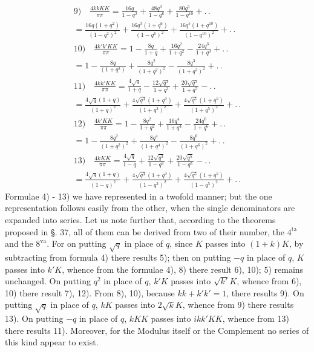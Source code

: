 \documentclass{article}
\begin{document}
\[
\begin{gathered}
\text{9)}\quad\frac{4kkKK}{\pi\pi}=\frac{16q}{1-q^{2}}+\frac{48q^{3}}{1-q^{6}}+\frac{80q^{5}}{1-q^{10}}+.\,.\\[2ex]
=\frac{16q(1+q^{2})}{(1-q^{2})^{2}}+\frac{16q^{3}(1+q^{6})}{(1-q^{6})^{2}}+\frac{16q^{5}(1+q^{10})}{(1-q^{10})^{2}}+.\,.\\[2ex]
\text{10)}\quad\frac{4k'k'KK}{\pi\pi}=1-\frac{8q}{1+q}+\frac{16q^{2}}{1+q^{2}}-\frac{24q^{3}}{1+q^{3}}+.\,.\\[2ex]
=1-\frac{8q}{(1+q^{2})}+\frac{8q^{2}}{(1+q^{2})^{2}}-\frac{8q^{3}}{(1+q^{3})^{2}}+.\,.\\[2ex]
\text{11)}\quad\frac{4kk'KK}{\pi\pi}=\frac{4\sqrt{q}}{1+q}-\frac{12\sqrt{q^{3}}}{1+q^{3}}+\frac{20\sqrt{q^{5}}}{1+q^{5}}-.\,.\\[2ex]
=\frac{4\sqrt{q}(1+q)}{(1+q)^{2}}+\frac{4\sqrt{q^{3}}(1+q^{3})}{(1+q^{3})^{2}}+\frac{4\sqrt{q^{5}}(1+q^{5})}{(1+q^{5})^{2}}+.\,.\\[2ex]
\text{12)}\quad\frac{4k'KK}{\pi\pi}=1-\frac{8q^{2}}{1+q^{2}}+\frac{16q^{4}}{1+q^{4}}-\frac{24q^{6}}{1+q^{6}}+.\,.\\[2ex]
=1-\frac{8q^{2}}{(1+q^{2})^{2}}+\frac{8q^{4}}{(1+q^{4})^{2}}-\frac{8q^{6}}{(1+q^{6})^{2}}+.\,.\\[2ex]
\text{13)}\quad\frac{4kKK}{\pi\pi}=\frac{4\sqrt{q}}{1-q}+\frac{12\sqrt{q^{3}}}{1-q^{3}}+\frac{20\sqrt{q^{5}}}{1-q^{5}}-.\,.\\[2ex]
=\frac{4\sqrt{q}(1+q)}{(1-q)^{2}}+\frac{4\sqrt{q^{3}}(1+q^{3})}{(1-q^{3})^{2}}+\frac{4\sqrt{q^{5}}(1+q^{5})}{(1-q^{5})^{2}}+.\,.
\end{gathered}
\]
Formulae 4) - 13) we have represented in a twofold manner; but the one representation follows easily from the other, when the single denominators are expanded into series. Let us note further that, according to the theorems proposed in §. 37, all of them can be derived from two of their number, the $4^{\mathrm{ta}}$ and the $8^{\mathrm{va}}$. For on putting $\sqrt{q}$ in place of $q$, since $K$ passes into $(1+k)K$, by subtracting from formula 4) there results 5); then on putting $-q$ in place of $q$, $K$ passes into $k'K$, whence from the formulae 4), 8) there result 6), 10); 5) remains unchanged. On putting $q^{2}$ in place of $q$, $k'K$ passes into $\sqrt{k'}K$, whence from 6), 10) there result 7), 12). From 8), 10), because $kk+k'k'=1$, there results 9). On putting $\sqrt{q}$ in place of $q$, $kK$ passes into $2\sqrt{k}K$, whence from 9) there results 13). On putting $-q$ in place of $q$, $kKK$ passes into $ikk'KK$, whence from 13) there results 11). Moreover, for the Modulus itself or the Complement no series of this kind appear to exist.
\end{document}
